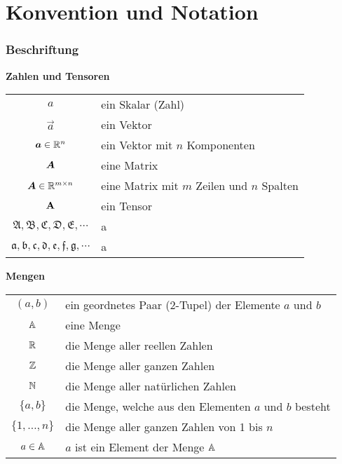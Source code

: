 \chapter*{Konvention und Notation}

\subsection*{Beschriftung}

\begin{center}\textbf{Zahlen und Tensoren}\end{center}
\begin{tabular}{cl}
  $a$ & ein Skalar (Zahl) \\
  $\vec{a}$ & ein Vektor \\
  $\bm{a} \in \mathbb{R}^{n}$ & ein Vektor mit $n$ Komponenten \\
  $\bm{A}$ & eine Matrix \\
  $\bm{A} \in \mathbb{R}^{m \times n}$ & eine Matrix mit $m$ Zeilen und $n$ Spalten \\
  $\mathbf{A}$ & ein Tensor \\
  $\mathfrak{A,B,C,D,E,\cdots}$ & a \\
  $\mathfrak{a,b,c,d,e,f,g,\cdots}$ & a \\


\end{tabular}

\begin{center}\textbf{Mengen}\end{center}
\begin{tabular}{cl}
  $(a,b)$ & ein geordnetes Paar (2-Tupel) der Elemente $a$ und $b$ \\
  $\mathbb{A}$ & eine Menge \\
  $\mathbb{R}$ & die Menge aller reellen Zahlen \\
  $\mathbb{Z}$ & die Menge aller ganzen Zahlen \\
  $\mathbb{N}$ & die Menge aller natürlichen Zahlen \\
  $\{a,b\}$ & die Menge, welche aus den Elementen $a$ und $b$ besteht \\
  $\{1,\ldots,n\}$ & die Menge aller ganzen Zahlen von 1 bis $n$ \\
  $a \in \mathbb{A}$ & $a$ ist ein Element der Menge $\mathbb{A}$ \\

\end{tabular}


